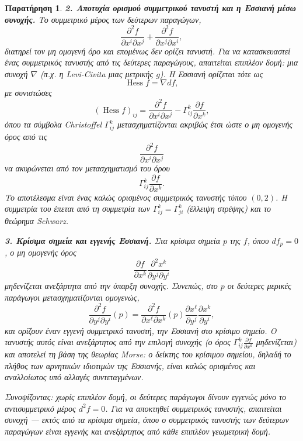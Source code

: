 \documentclass[11pt,a4paper,twoside,openright]{book}
\newtheorem{remark}[lemma]{Παρατήρηση}
\begin{document}
\begin{remark}
\textbf{2. Αποτυχία ορισμού συμμετρικού τανυστή και η Εσσιανή μέσω συνοχής.} Το συμμετρικό μέρος των δεύτερων παραγώγων,
\begin{equation}
\frac{\partial^2 f}{\partial x^i \partial x^j} + \frac{\partial^2 f}{\partial x^j \partial x^i},
\end{equation}
διατηρεί τον μη ομογενή όρο και επομένως δεν ορίζει τανυστή. Για να κατασκευαστεί ένας συμμετρικός τανυστής από τις δεύτερες παραγώγους, απαιτείται επιπλέον δομή: μια συνοχή \(\nabla\) (π.χ. η Levi-Civita μιας μετρικής \(g\)). Η Εσσιανή ορίζεται τότε ως
\begin{equation}
\operatorname{Hess} f = \nabla df,
\end{equation}
με συνιστώσες
\begin{equation}
(\operatorname{Hess} f)_{ij} = \frac{\partial^2 f}{\partial x^i \partial x^j} - \Gamma^k_{ij} \frac{\partial f}{\partial x^k},
\end{equation}
όπου τα σύμβολα Christoffel \(\Gamma^k_{ij}\) μετασχηματίζονται ακριβώς έτσι ώστε ο μη ομογενής όρος από τις
\begin{equation}
\frac{\partial^2 f}{\partial x^i \partial x^j}
\end{equation}
να ακυρώνεται από τον μετασχηματισμό του όρου
\begin{equation}
\Gamma^k_{ij} \frac{\partial f}{\partial x^k}.
\end{equation}
Το αποτέλεσμα είναι ένας καλώς ορισμένος συμμετρικός τανυστής τύπου \((0,2)\). Η συμμετρία του έπεται από τη συμμετρία των \(\Gamma^k_{ij} = \Gamma^k_{ji}\) (έλλειψη στρέψης) και το θεώρημα Schwarz.

\textbf{3. Κρίσιμα σημεία και εγγενής Εσσιανή.} Στα κρίσιμα σημεία \(p\) της \(f\), όπου \(df_p = 0\), ο μη ομογενής όρος
\begin{equation}
\frac{\partial f}{\partial x^k} \frac{\partial^2 x^k}{\partial y^j \partial y^i}
\end{equation}
μηδενίζεται ανεξάρτητα από την ύπαρξη συνοχής. Συνεπώς, στο \(p\) οι δεύτερες μερικές παράγωγοι μετασχηματίζονται ομογενώς,
\begin{equation}
\frac{\partial^2 f}{\partial y^j \partial y^i}(p) = \frac{\partial^2 f}{\partial x^\ell \partial x^k}(p) \frac{\partial x^\ell}{\partial y^j} \frac{\partial x^k}{\partial y^i},
\end{equation}
και ορίζουν έναν εγγενή συμμετρικό τανυστή, την Εσσιανή στο κρίσιμο σημείο. Ο τανυστής αυτός είναι ανεξάρτητος από την επιλογή συνοχής (ο όρος \(\Gamma^k_{ij} \frac{\partial f}{\partial x^k}\) μηδενίζεται) και αποτελεί τη βάση της θεωρίας Morse: ο δείκτης του κρίσιμου σημείου, δηλαδή το πλήθος των αρνητικών ιδιοτιμών της Εσσιανής, είναι καλώς ορισμένος και αναλλοίωτος υπό αλλαγές συντεταγμένων.

Συνοψίζοντας: χωρίς επιπλέον δομή, οι δεύτερες παράγωγοι δίνουν εγγενώς μόνο το αντισυμμετρικό μέρος \(d^2f = 0\). Για να αποκτηθεί συμμετρικός τανυστής, απαιτείται συνοχή --- εκτός από τα κρίσιμα σημεία, όπου ο συμμετρικός τανυστής των δεύτερων παραγώγων είναι εγγενής και ανεξάρτητος από κάθε επιπλέον γεωμετρική δομή.
\end{remark}
\end{document}
